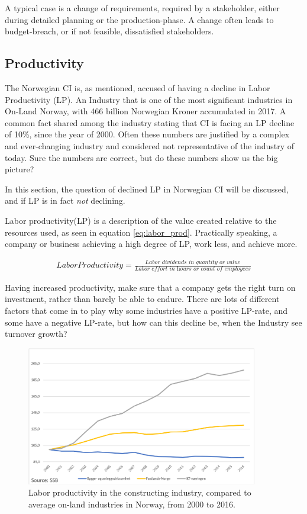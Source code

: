 A typical case is a change of requirements, required by a stakeholder, either during detailed planning or the production-phase. A change often leads to budget-breach, or if not feasible, dissatisfied stakeholders. 

\subsection{Productivity}
The Norwegian CI is, as mentioned, accused of having a decline in Labor Productivity (LP). An Industry that is one of the most significant industries in On-Land Norway, with 466 billion Norwegian Kroner accumulated in 2017. A common fact shared among the industry stating that CI is facing an LP decline of 10\%, since the year of 2000. Often these numbers are justified by a complex and ever-changing industry and considered not representative of the industry of today. Sure the numbers are correct, but do these numbers show us the big picture?

In this section, the question of declined LP in Norwegian CI will be discussed, and if LP is in fact \textit{not} declining.

Labor productivity(LP) is a description of the value created relative to the resources used, as seen in equation \ref{eq:labor_prod}. Practically speaking, a company or business achieving a high degree of LP, work less, and achieve more. 

\begin{eqnarray}\label{eq:labor_prod}
Labor Productivity = \frac{\textit{Labor dividends in quantity or value}}{\textit{Labor effort in hours or count of employees}} 
\end{eqnarray}

Having increased productivity, make sure that a company gets the right turn on investment, rather than barely be able to endure. There are lots of different factors that come in to play why some industries have a positive LP-rate, and some have a negative LP-rate, but how can this decline be, when the Industry see turnover growth?

\begin{figure}
    \centering
    \includegraphics[width=0.9\textwidth]{fig/ba_on-land_ICT.png}
    \caption{Labor productivity in the constructing industry, compared to average on-land industries in Norway, from 2000 to 2016.}
    \label{fig:productivity-comparing}
\end{figure}

